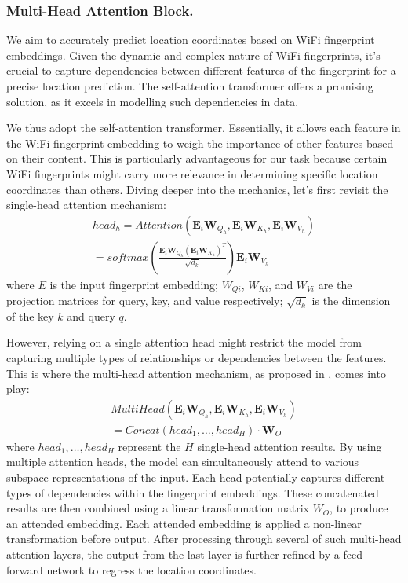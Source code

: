 \subsubsection{Multi-Head Attention Block.}

We aim to accurately predict location coordinates based on WiFi fingerprint embeddings. Given the dynamic and complex nature of WiFi fingerprints, it's crucial to capture dependencies between different features of the fingerprint for a precise location prediction. The self-attention transformer offers a promising solution, as it excels in modelling such dependencies in data. 

We thus adopt the self-attention transformer. Essentially, it allows each feature in the WiFi fingerprint embedding to weigh the importance of other features based on their content. This is particularly advantageous for our task because certain WiFi fingerprints might carry more relevance in determining specific location coordinates than others. Diving deeper into the mechanics, let's first revisit the single-head attention mechanism:
\begin{equation}
\begin{aligned}
head_h = Attention(\mathbf{E}_i \mathbf{W}_{Q_h}, \mathbf{E}_i \mathbf{W}_{K_h}, \mathbf{E}_i \mathbf{W}_{V_h}) \\
= softmax\left(\frac{\mathbf{E}_i \mathbf{W}_{Q_h}(\mathbf{E}_i \mathbf{W}_{K_h})^T}{\sqrt{d_k}}\right)\mathbf{E}_i \mathbf{W}_{V_h}
\end{aligned}
\end{equation}
where $E$ is the input fingerprint embedding; $W_{Qi}$, $W_{Ki}$, and $W_{Vi}$ are the projection matrices for query, key, and value respectively; $\sqrt{d_k}$ is the dimension of the key $k$ and query $q$.

However, relying on a single attention head might restrict the model from capturing multiple types of relationships or dependencies between the features. This is where the multi-head attention mechanism, as proposed in \cite{vaswani2017attention}, comes into play:
\begin{equation}
\begin{aligned}
MultiHead(\mathbf{E}_i \mathbf{W}_{Q_h}, \mathbf{E}_i \mathbf{W}_{K_h}, \mathbf{E}_i \mathbf{W}_{V_h})\\=Concat(head_1, \ldots, head_H) \cdot \mathbf{W}_O
\end{aligned}
\end{equation}
where $head_1, \ldots, head_H$ represent the $H$ single-head attention results. By using multiple attention heads, the model can simultaneously attend to various subspace representations of the input. Each head potentially captures different types of dependencies within the fingerprint embeddings. 
These concatenated results are then combined using a linear transformation matrix $W_O$, to produce an attended embedding. Each attended embedding is applied a non-linear transformation before output. After processing through several of such multi-head attention layers, the output from the last layer is further refined by a feed-forward network to regress the location coordinates.



